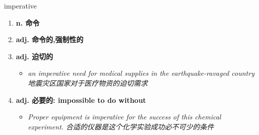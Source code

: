 
\begin{frame}
{\huge imperative}
\begin{center}
\begin{enumerate}\Large
  \item \textbf{n. 命令}
  \item \textbf{adj. 命令的,强制性的}
  \item \textbf{adj. 迫切的}
  \begin{itemize}
    \item \em{\Large{an imperative need for medical supplies in the earthquake-ravaged country 地震灾区国家对于医疗物资的迫切需求}}
  \end{itemize}
  \item \textbf{adj. 必要的: impossible to do without}
  \begin{itemize}
    \item \em{\Large{Proper equipment is imperative for the success of this chemical experiment. 合适的仪器是这个化学实验成功必不可少的条件}}
  \end{itemize}
\end{enumerate}
\end{center}
\end{frame}
